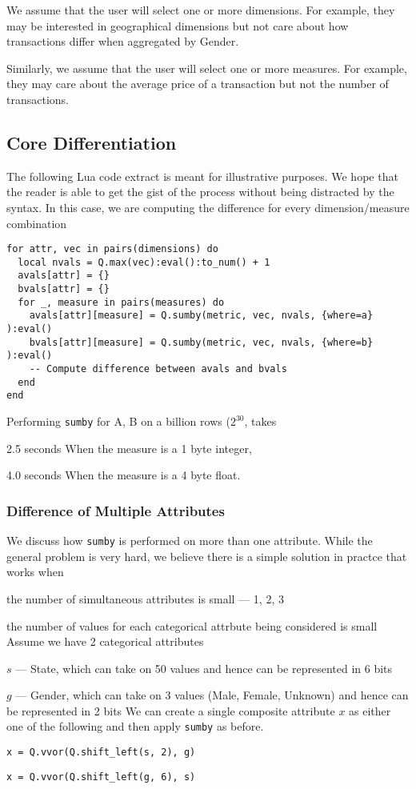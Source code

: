We assume that the user will select one or more dimensions. For example, they
may be interested in geographical dimensions but not care about how transactions
differ when aggregated by Gender. 

Similarly, we assume that the user will select one or more measures. For
example, they may care about the average
price of a transaction but not the number of transactions.

\subsection{Core Differentiation}
\label{Differentiation}

The following Lua code extract is meant for illustrative purposes. We hope that
the reader is able to get the gist of the process without being distracted by
the syntax. In this case, we are computing the difference for every
dimension/measure combination
\begin{verbatim}
for attr, vec in pairs(dimensions) do 
  local nvals = Q.max(vec):eval():to_num() + 1
  avals[attr] = {}
  bvals[attr] = {}
  for _, measure in pairs(measures) do 
    avals[attr][measure] = Q.sumby(metric, vec, nvals, {where=a} ):eval()
    bvals[attr][measure] = Q.sumby(metric, vec, nvals, {where=b} ):eval()
    -- Compute difference between avals and bvals
  end
end
\end{verbatim}
Performing {\tt sumby} for A, B on a billion rows (\(2^{30}\), takes 
\be
\item 2.5 seconds When the measure is a 1 byte integer, 
\item 4.0 seconds When the measure is a 4 byte float.
\ee

\subsubsection{Difference of Multiple Attributes}

We discuss how {\tt sumby} is performed on more than one attribute. While the
general problem is very hard, we believe there is a simple solution in practce
that works when
\be
\item the number of simultaneous attributes is small --- 1, 2, 3
\item the number of values for each categorical attrbute being considered is
small
\ee
Assume we have 2 categorical attributes
\be
\item \(s\) --- State, which can take on 50 values and hence can be represented in 6 bits
\item \(g\) --- Gender, which can take on 3 values (Male, Female, Unknown) and hence can
be represented in 2 bits
\ee
We can create a single composite attribute \(x\) as either one of the following
and then apply {\tt sumby} as before. 
\be
\item \verb+x = Q.vvor(Q.shift_left(s, 2), g)+
\item \verb+x = Q.vvor(Q.shift_left(g, 6), s)+
\ee

